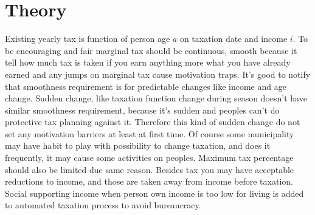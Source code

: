 %
%
%
\begin{comment}\end{comment}
\chapter{Theory}
\label{theory}
Existing yearly tax is function of person age $a$ on taxation date and income $i$.
To be encouraging and fair marginal tax should be continuous,
smooth because it tell how much tax is taken if you earn anything more what you have already earned
and any jumps on marginal tax cause motivation traps.
It's good to notify that smoothness requirement is for predictable changes like income and age change.
Sudden change, like taxation function change during season doesn't have similar smoothness requirement,
because it's sudden and peoples can't do protective tax planning against it.
Therefore this kind of sudden change do not set any motivation barriers at least at first time.
Of course some municipality may have habit to play with possibility to change taxation,
and does it frequently, it may cause some activities on peoples.
Maximum tax percentage should also be limited due same reason.
Besides tax you may have acceptable reductions to income,
and those are taken away from income before taxation.
Social supporting income when person own income is too low for living is added to
automated taxation process to avoid bureaucracy.
